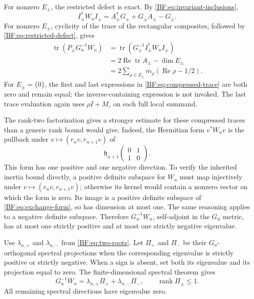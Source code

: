 For nonzero \(E_\pm\), the restricted defect is exact.
By \eqref{BF:eq:invariant-inclusions},
\begin{equation}
I_\pm^*W_nI_\pm
 =A_\pm^*G_\pm+G_\pm A_\pm-G_\pm.
\tag{BF.29}\label{BF:eq:restricted-defect}
\end{equation}
For nonzero \(E_\pm\), cyclicity of the trace of the rectangular
composites, followed by \eqref{BF:eq:restricted-defect}, gives
\begin{equation}
\begin{split}
\operatorname{tr}(P_\pm G_n^{-1}W_n)
&=\operatorname{tr}\!\left(
  G_\pm^{-1}I_\pm^*W_nI_\pm\right)\\
&=2\operatorname{Re}\operatorname{tr}A_\pm-\dim E_\pm\\
&=2\sum_{\rho\in Z_\pm}
        m_\rho(\operatorname{Re}\rho-1/2).
\end{split}
\tag{BF.30}\label{BF:eq:compressed-trace}
\end{equation}
For \(E_\pm=\{0\}\), the first and last expressions in
\eqref{BF:eq:compressed-trace} are both zero and remain equal;
the inverse-containing expression is not invoked.
The last trace evaluation again uses
\(\rho I+M_z\) on each full local summand.

The rank-two factorization gives a stronger estimate for these
compressed traces than a generic rank bound would give.
Indeed, the Hermitian form \(v^*W_nv\) is the pullback under
\(v\mapsto(r_nv,r_{n+1}v)\) of
\begin{equation}
\mathfrak h_{n+1}
\begin{pmatrix}0&1\\1&0\end{pmatrix}.
\tag{BF.31}\label{BF:eq:exchange-form}
\end{equation}
This form has one positive and one negative direction.
To verify the inherited inertia bound directly, a positive definite
subspace for \(W_n\) must map injectively under
\(v\mapsto(r_nv,r_{n+1}v)\); otherwise its kernel would contain
a nonzero vector on which the form is zero.
Its image is a positive definite subspace of
\eqref{BF:eq:exchange-form}, so has dimension at most one.
The same reasoning applies to a negative definite subspace.
Therefore \(G_n^{-1}W_n\), self-adjoint in the \(G_n\) metric,
has at most one strictly positive and at most one strictly negative
eigenvalue.

Use \(\lambda_{n,+}\) and \(\lambda_{n,-}\) from
\eqref{BF:eq:two-roots}.  Let \(\Pi_+\) and \(\Pi_-\)
be their \(G_n\)-orthogonal spectral projections when the
corresponding eigenvalue is strictly positive or strictly negative.
When a sign is absent, set both its eigenvalue and its projection
equal to zero.  The finite-dimensional spectral theorem gives
\begin{equation}
G_n^{-1}W_n
 =\lambda_{n,+}\Pi_++\lambda_{n,-}\Pi_-,
\qquad \operatorname{rank}\Pi_\pm\le1.
\tag{BF.32}\label{BF:eq:spectral-projections}
\end{equation}
All remaining spectral directions have eigenvalue zero.

